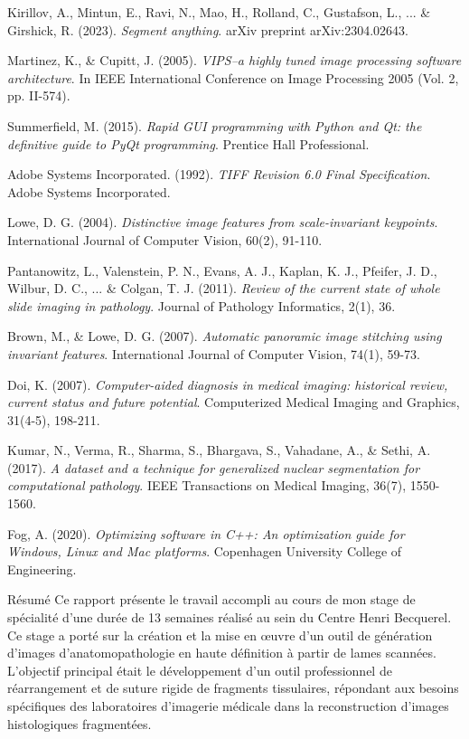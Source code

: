 \documentclass[12pt,a4paper]{report}
\begin{document}
\begin{}
\begin{}
\begin{}
\begin{}
\begin{thebibliography}{20}
Kirillov, A., Mintun, E., Ravi, N., Mao, H., Rolland, C., Gustafson, L., ... \& Girshick, R. (2023). 
\textit{Segment anything}. 
arXiv preprint arXiv:2304.02643.

Martinez, K., \& Cupitt, J. (2005). 
\textit{VIPS–a highly tuned image processing software architecture}. 
In IEEE International Conference on Image Processing 2005 (Vol. 2, pp. II-574).

Summerfield, M. (2015). 
\textit{Rapid GUI programming with Python and Qt: the definitive guide to PyQt programming}. 
Prentice Hall Professional.

Adobe Systems Incorporated. (1992). 
\textit{TIFF Revision 6.0 Final Specification}. 
Adobe Systems Incorporated.

Lowe, D. G. (2004). 
\textit{Distinctive image features from scale-invariant keypoints}. 
International Journal of Computer Vision, 60(2), 91-110.

Pantanowitz, L., Valenstein, P. N., Evans, A. J., Kaplan, K. J., Pfeifer, J. D., Wilbur, D. C., ... \& Colgan, T. J. (2011). 
\textit{Review of the current state of whole slide imaging in pathology}. 
Journal of Pathology Informatics, 2(1), 36.

Brown, M., \& Lowe, D. G. (2007). 
\textit{Automatic panoramic image stitching using invariant features}. 
International Journal of Computer Vision, 74(1), 59-73.

Doi, K. (2007). 
\textit{Computer-aided diagnosis in medical imaging: historical review, current status and future potential}. 
Computerized Medical Imaging and Graphics, 31(4-5), 198-211.

Kumar, N., Verma, R., Sharma, S., Bhargava, S., Vahadane, A., \& Sethi, A. (2017). 
\textit{A dataset and a technique for generalized nuclear segmentation for computational pathology}. 
IEEE Transactions on Medical Imaging, 36(7), 1550-1560.

Fog, A. (2020). 
\textit{Optimizing software in C++: An optimization guide for Windows, Linux and Mac platforms}. 
Copenhagen University College of Engineering.

\end{thebibliography}

\newpage
\thispagestyle{empty}

\begin{resume}{Résumé}
Ce rapport présente le travail accompli au cours de mon stage de spécialité d'une durée de 13 semaines réalisé au sein du Centre Henri Becquerel. Ce stage a porté sur la création et la mise en œuvre d'un outil de génération d'images d'anatomopathologie en haute définition à partir de lames scannées. L'objectif principal était le développement d'un outil professionnel de réarrangement et de suture rigide de fragments tissulaires, répondant aux besoins spécifiques des laboratoires d'imagerie médicale dans la reconstruction d'images histologiques fragmentées.


\end{resume}
\end{}
\end{}
\end{}
\end{}
\end{document}
